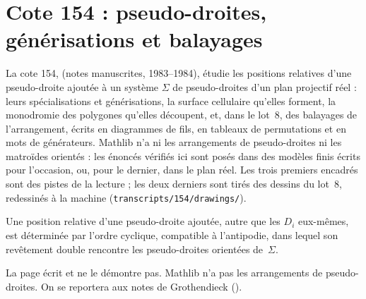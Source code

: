 \section[Cote 154 : pseudo-droites, générisations et balayages]{Cote 154 : pseudo-droites, générisations et balayages\protect{}}\label{sec:154}

La cote 154,  (notes manuscrites, 1983--1984), étudie les positions relatives d'une pseudo-droite ajoutée à un système $\Sigma$ de pseudo-droites d'un plan projectif réel : leurs spécialisations et générisations, la surface cellulaire qu'elles forment, la monodromie des polygones qu'elles découpent, et, dans le lot~8, des balayages de l'arrangement, écrits en diagrammes de fils, en tableaux de permutations et en mots de générateurs. Mathlib n'a ni les arrangements de pseudo-droites ni les matroïdes orientés : les énoncés vérifiés ici sont posés dans des modèles finis écrits pour l'occasion, ou, pour le dernier, dans le plan réel. Les trois premiers encadrés sont des pistes de la lecture ; les deux derniers sont tirés des dessins du lot~8, redessinés à la machine (\texttt{transcripts/154/drawings/}).

\begin{encadre}
\begin{conjecture*}
Une position relative d'une pseudo-droite ajoutée, autre que les $D_i$ eux-mêmes, est déterminée par l'ordre cyclique, compatible à l'antipodie, dans lequel son revêtement double rencontre les pseudo-droites orientées de~$\Sigma$.
\end{conjecture*}
\end{encadre}
{\small La page écrit  et ne le démontre pas. Mathlib n'a pas les arrangements de pseudo-droites. On se reportera aux notes de Grothendieck ().\par}

